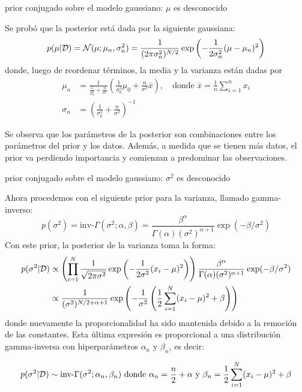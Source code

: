 \documentclass[9pt]{beamer}
\begin{document}
\begin{frame}{prior conjugado sobre el modelo gaussiano: $\mu$ es desconocido}

Se probó que la posterior está dada por la siguiente gaussiana:
  \begin{equation*}
 	p(\mu|{\mathcal D}) = {\mathcal N}(\mu;\mu_n,\sigma_n^2) = \frac{1}{(2\pi\sigma_n^2)^{N/2}}\exp\left(-\frac{1}{2\sigma_n^2}(\mu - \mu_n)^2\right)
 \end{equation*} 
 donde, luego de reordenar términos, la media y la varianza están dadas por 
 \begin{align*}
 	\mu_n &= \frac{1}{\tfrac{1}{\sigma_0^2} + \tfrac{n}{\sigma^2}} \left(\frac{1}{\sigma_0^2}\mu_0 + \frac{n}{\sigma^2}\bar{x} \right), \quad \text{donde } \bar{x} = \frac{1}{n}\sum_{i=1}^n x_i\label{eq:post_Gm}\\
 	\sigma_n &= \left(\frac{1}{\sigma_0^2} + \frac{n}{\sigma^2}\right)^{-1}
 \end{align*}\pause

Se observa que los parámetros de la posterior son combinaciones entre los parámetros del prior y los datos. Además, a medida que se tienen más datos, el prior va perdiendo importancia y comienzan a predominar las observaciones.
	
\end{frame}

\begin{frame}{prior conjugado sobre el modelo gaussiano: $\sigma^2$ es desconocido}

Ahora procedemos con el siguiente prior para la varianza, llamado gamma-inverso:
 \begin{equation*}
 	p(\sigma^2)= \text{inv-}\Gamma(\sigma^2;\alpha,\beta) = \frac{\beta^\alpha}{\Gamma(\alpha) (\sigma^2)^{\alpha+1}}\exp(-\beta/\sigma^2)
 \end{equation*}\pause
Con este prior, la posterior de la varianza toma la forma:
 \begin{align*}
 	p(\sigma^2|{\mathcal D}) &\propto \left(\prod_{i=1}^N \frac{1}{\sqrt{2\pi\sigma^2}}\exp\left(-\frac{1}{2\sigma^2}(x_i-\mu)^2\right)\right) \frac{\beta^\alpha}{\Gamma(\alpha) (\sigma^2)^{\alpha+1}}\exp(-\beta/\sigma^2)\\
 	&\propto  \frac{1}{(\sigma^2)^{N/2+\alpha+1}}\exp\left(-\frac{1}{\sigma^2}\left(\frac{1}{2}\sum_{i=1}^N(x_i-\mu)^2 +\beta\right) \right)\nonumber
 \end{align*} 
 donde nuevamente la proporcionalidad ha sido mantenida debido a la remoción de las constantes. \pause Esta última expresión es proporcional a una distribución gamma-inversa con hiperparámetros $\alpha_n$ y $\beta_n$, es decir:
 
 \begin{equation*}
 	p(\sigma^2|{\mathcal D}) \sim \text{inv-}\Gamma(\sigma^2;\alpha_n,\beta_n) \text{ donde } \alpha_n = \frac{n}{2}+\alpha \text{ y } \beta_n = \frac{1}{2}\sum_{i=1}^N(x_i-\mu)^2 +\beta
 \end{equation*}
	
\end{frame}
\end{document}
